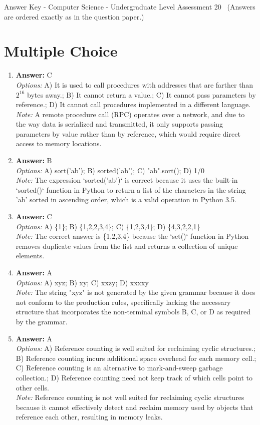 \documentclass[12pt]{article}
\begin{document}
\begin{center}
Answer Key - Computer Science - Undergraduate Level Assessment 20 \
\small (Answers are ordered exactly as in the question paper.)
\end{center}

\section*{Multiple Choice}
\begin{enumerate}[label=\arabic*.]
\item \textbf{Answer:} C
\\ \textit{Options:} A) It is used to call procedures with addresses that are farther than $2^16$ bytes away.; B) It cannot return a value.; C) It cannot pass parameters by reference.; D) It cannot call procedures implemented in a different language.
\\ \textit{Note:} A remote procedure call (RPC) operates over a network, and due to the way data is serialized and transmitted, it only supports passing parameters by value rather than by reference, which would require direct access to memory locations.
\item \textbf{Answer:} B
\\ \textit{Options:} A) sort('ab'); B) sorted('ab'); C) "ab".sort(); D) 1/0
\\ \textit{Note:} The expression `sorted('ab')` is correct because it uses the built-in `sorted()` function in Python to return a list of the characters in the string 'ab' sorted in ascending order, which is a valid operation in Python 3.5.
\item \textbf{Answer:} C
\\ \textit{Options:} A) \{1\}; B) \{1,2,2,3,4\}; C) \{1,2,3,4\}; D) \{4,3,2,2,1\}
\\ \textit{Note:} The correct answer is \{1,2,3,4\} because the `set()` function in Python removes duplicate values from the list and returns a collection of unique elements.
\item \textbf{Answer:} A
\\ \textit{Options:} A) xyz; B) xy; C) xxzy; D) xxxxy
\\ \textit{Note:} The string "xyz" is not generated by the given grammar because it does not conform to the production rules, specifically lacking the necessary structure that incorporates the non-terminal symbols B, C, or D as required by the grammar.
\item \textbf{Answer:} A
\\ \textit{Options:} A) Reference counting is well suited for reclaiming cyclic structures.; B) Reference counting incurs additional space overhead for each memory cell.; C) Reference counting is an alternative to mark-and-sweep garbage collection.; D) Reference counting need not keep track of which cells point to other cells.
\\ \textit{Note:} Reference counting is not well suited for reclaiming cyclic structures because it cannot effectively detect and reclaim memory used by objects that reference each other, resulting in memory leaks.
\end{enumerate}
\end{document}
